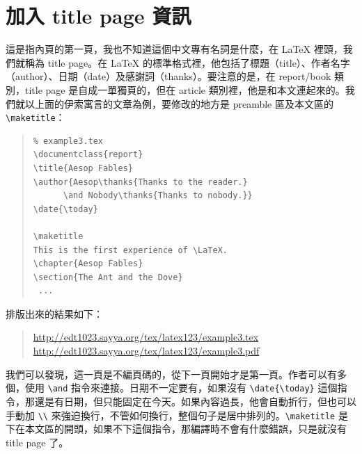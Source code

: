 \section{加入 title page 資訊}
\label{sec:titlepage}

這是指內頁的第一頁，我也不知道這個中文專有名詞是什麼，在 \LaTeX{} 裡頭，我們就稱為 title page。在 \LaTeX{} 的標準格式裡，他包括了標題（title）、作者名字（author）、日期（date）及感謝詞（thanks）。要注意的是，在 {\ttfamily report/book} 類別，title page 是自成一單獨頁的，但在 {\ttfamily article} 類別裡，他是和本文連起來的。我們就以上面的伊索寓言的文章為例，要修改的地方是 preamble 區及本文區的 \verb|\maketitle|\index{\verb=\maketitle=}：

\begin{quote}
   \begin{verbatim}
% example3.tex
\documentclass{report}
\title{Aesop Fables}
\author{Aesop\thanks{Thanks to the reader.}
      \and Nobody\thanks{Thanks to nobody.}}
\date{\today}

\maketitle
This is the first experience of \LaTeX.
\chapter{Aesop Fables}
\section{The Ant and the Dove}
 ...
\end{verbatim}
\end{quote}

排版出來的結果如下：

\begin{quote}
   \url{http://edt1023.sayya.org/tex/latex123/example3.tex}\\
   \url{http://edt1023.sayya.org/tex/latex123/example3.pdf}
\end{quote}

我們可以發現，這一頁是不編頁碼的，從下一頁開始才是第一頁。作者可以有多個，使用 \verb|\and| 指令來連接。日期不一定要有，如果沒有 \verb|\date{\today}| 這個指令，那還是有日期，但只能固定在今天。如果內容過長，他會自動折行，但也可以手動加 \verb|\\| 來強迫換行，不管如何換行，整個句子是居中排列的。\verb|\maketitle| 是下在本文區的開頭，如果不下這個指令，那編譯時不會有什麼錯誤，只是就沒有 title page 了。

